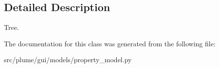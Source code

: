 \subsection{Detailed Description}
Tree. 

The documentation for this class was generated from the following file\+:\begin{DoxyCompactItemize}
\item 
src/plume/gui/models/property\+\_\+model.\+py\end{DoxyCompactItemize}
